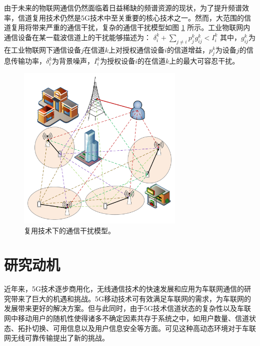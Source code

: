 \textcolor[RGB]{202,12,22}{由于未来的物联网通信仍然面临着日益稀缺的频谱资源的现状，为了提升频谱效率，信道复用技术仍然是5G技术中至关重要的核心技术之一。然而，大范围的信道复用将带来严重的通信干扰，复杂的通信干扰模型如图 \ref{复用技术下的通信干扰模型} 所示。工业物联网内通信设备在某一载波信道上的干扰能够描述为：
$\delta _{i}^{k}+\sum\limits_{j\ne i}{p_{j}^{k}g_{ij}^{k}}<I_{i}^{k}$
其中，$g_{ij}^{k}$为在工业物联网下通信设备$j$在信道$k$上对授权通信设备$i$的信道增益，$p_{j}^{k}$为设备$j$的信息传输功率，$\delta _{i}^{k}$为背景噪声，$I_{i}^{k}$为授权设备$i$的在信道$k$上的最大可容忍干扰。}
\begin{figure}[H]
\centering
\includegraphics[width=8cm]{figures//chap1//复用技术下的通信干扰模型.pdf}
\caption{复用技术下的通信干扰模型。}
\label{复用技术下的通信干扰模型}
\end{figure}
\section{研究动机}\label{section1-3}
\textcolor[RGB]{202,12,22}{近年来，5G技术逐步商用化，无线通信技术的快速发展和应用为车联网通信的研究带来了巨大的机遇和挑战。5G移动技术可有效满足车联网的需求，为车联网的发展带来更好的解决方案。但与此同时，由于5G技术信道状态的复杂性以及车联网中移动用户的随机性使得诸多不确定因素共存于系统之中，如用户数量、信道状态、拓扑切换、可用信息以及用户信息安全等方面。可见这种高动态环境对于车联网无线可靠传输提出了新的挑战。}

